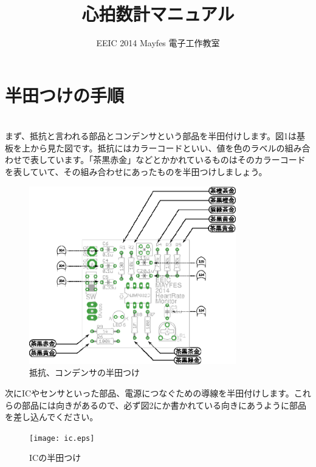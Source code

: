 \documentclass[a4paper]{jarticle}
\title{心拍数計マニュアル}
\author{EEIC 2014 Mayfes 電子工作教室}
\begin{document}
\maketitle
\setlength{\columnseprule}{0.4pt}


\section{半田つけの手順}
　\\
まず、抵抗と言われる部品とコンデンサという部品を半田付けします。図1は基板を上から見た図です。抵抗にはカラーコードといい、値を色のラベルの組み合わせで表しています。「茶黒赤金」などとかかれているものはそのカラーコードを表していて、その組み合わせにあったものを半田つけしましょう。
\begin{figure}[H]
 \centering
 \small %
 \includegraphics[width=9cm]{rc.eps}
 \caption{\small{抵抗、コンデンサの半田つけ}} 
\end{figure}
次にICやセンサといった部品、電源につなぐための導線を半田付けします。これらの部品には向きがあるので、必ず図2にか書かれている向きにあうように部品を差し込んでください。
\begin{figure}[H]
 \centering
 \small %
 \texttt{[image: ic.eps]}
 \caption{\small{ICの半田つけ}} 
\end{figure}

\newpage
\hspace{20mm}
\end{document}
